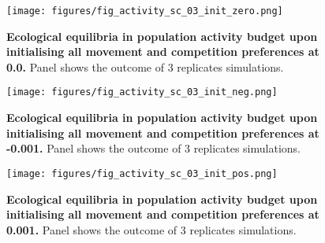 \documentclass[]{article}
\begin{document}
\begin{figure}
\centering
\texttt{[image: figures/fig\_activity\_sc\_03\_init\_zero.png]}
\caption{\textbf{Ecological equilibria in population activity budget upon initialising all movement and competition preferences at 0.0.} Panel shows the outcome of 3 replicates simulations.}
\end{figure}

\begin{figure}
\centering
\texttt{[image: figures/fig\_activity\_sc\_03\_init\_neg.png]}
\caption{\textbf{Ecological equilibria in population activity budget upon initialising all movement and competition preferences at -0.001.} Panel shows the outcome of 3 replicates simulations.}
\end{figure}

\begin{figure}
\centering
\texttt{[image: figures/fig\_activity\_sc\_03\_init\_pos.png]}
\caption{\textbf{Ecological equilibria in population activity budget upon initialising all movement and competition preferences at 0.001.} Panel shows the outcome of 3 replicates simulations.}
\end{figure}
\end{document}
